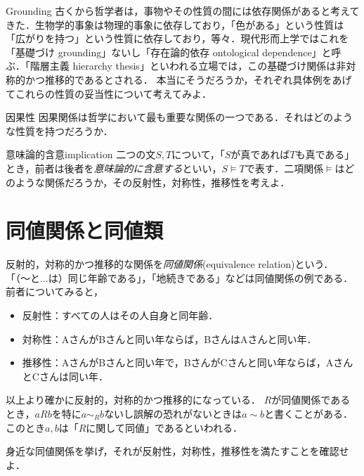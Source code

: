 \documentclass[dvipdfmx, 11pt,a4paper]{jsarticle}
\begin{document}
\begin{rei}{Grounding}{}
 古くから哲学者は，事物やその性質の間には依存関係があると考えてきた．生物学的事象は物理的事象に依存しており，「色がある」という性質は「広がりを持つ」という性質に依存しており，等々．現代形而上学ではこれを「基礎づけ grounding」ないし「存在論的依存 ontological dependence」と呼ぶ．「階層主義 hierarchy thesis」といわれる立場では，この基礎づけ関係は非対称的かつ推移的であるとされる．
本当にそうだろうか，それぞれ具体例をあげてこれらの性質の妥当性について考えてみよ．
\end{rei}

\begin{rei}{因果性}{}
 因果関係は哲学において最も重要な関係の一つである．それはどのような性質を持つだろうか．
\end{rei}

\begin{renshu}{意味論的含意}{implication}
二つの文$S, T$について，「$S$が真であれば$T$も真である」とき，前者は後者を\emph{意味論的に含意する}といい，$S \vDash T$で表す．二項関係$\vDash$はどのような関係だろうか，その反射性，対称性，推移性を考えよ．
\end{renshu}



\section{同値関係と同値類}
反射的，対称的かつ推移的な関係を\emph{同値関係}(equivalence relation)という．
「（〜と...は）同じ年齢である」，「地続きである」などは同値関係の例である．
前者についてみると，
\begin{itemize}
      \item 反射性：すべての人はその人自身と同年齢．
      \item 対称性：AさんがBさんと同い年ならば，BさんはAさんと同い年．
      \item 推移性：AさんがBさんと同い年で，BさんがCさんと同い年ならば，AさんとCさんは同い年．
\end{itemize}
以上より確かに反射的，対称的かつ推移的になっている．
$R$が同値関係であるとき，$aRb$を特に$a\sim_R b$ないし誤解の恐れがないときは$a \sim b$と書くことがある．
このとき$a,b$は「$R$に関して同値」であるといわれる．

\begin{renshu}{}{}
 身近な同値関係を挙げ，それが反射性，対称性，推移性を満たすことを確認せよ．
\end{renshu}

\begin{answer}
 
\end{answer}
\end{document}
